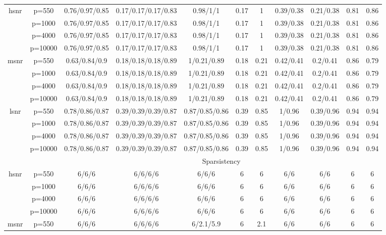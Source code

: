 \begin{table}[ht]
{\begin{tabular}{|c|c|ccccccccc|}
\midrule\multirow{4}[2]{*}{hsnr} & p=550 & 0.76/0.97/0.85 & 0.17/0.17/0.17/0.83 & 0.98/1/1 & 0.17 & 1 & 0.39/0.38 & 0.21/0.38 & 0.81 & 0.86 \\ 
   & p=1000 & 0.76/0.97/0.85 & 0.17/0.17/0.17/0.83 & 0.98/1/1 & 0.17 & 1 & 0.39/0.38 & 0.21/0.38 & 0.81 & 0.86 \\ 
   & p=4000 & 0.76/0.97/0.85 & 0.17/0.17/0.17/0.83 & 0.98/1/1 & 0.17 & 1 & 0.39/0.38 & 0.21/0.38 & 0.81 & 0.86 \\ 
   & p=10000 & 0.76/0.97/0.85 & 0.17/0.17/0.17/0.83 & 0.98/1/1 & 0.17 & 1 & 0.39/0.38 & 0.21/0.38 & 0.81 & 0.86 \\ 
  \midrule\multirow{4}[2]{*}{msnr} & p=550 & 0.63/0.84/0.9 & 0.18/0.18/0.18/0.89 & 1/0.21/0.89 & 0.18 & 0.21 & 0.42/0.41 & 0.2/0.41 & 0.86 & 0.79 \\ 
   & p=1000 & 0.63/0.84/0.9 & 0.18/0.18/0.18/0.89 & 1/0.21/0.89 & 0.18 & 0.21 & 0.42/0.41 & 0.2/0.41 & 0.86 & 0.79 \\ 
   & p=4000 & 0.63/0.84/0.9 & 0.18/0.18/0.18/0.89 & 1/0.21/0.89 & 0.18 & 0.21 & 0.42/0.41 & 0.2/0.41 & 0.86 & 0.79 \\ 
   & p=10000 & 0.63/0.84/0.9 & 0.18/0.18/0.18/0.89 & 1/0.21/0.89 & 0.18 & 0.21 & 0.42/0.41 & 0.2/0.41 & 0.86 & 0.79 \\ 
  \midrule\multirow{4}[2]{*}{lsnr} & p=550 & 0.78/0.86/0.87 & 0.39/0.39/0.39/0.87 & 0.87/0.85/0.86 & 0.39 & 0.85 & 1/0.96 & 0.39/0.96 & 0.94 & 0.94 \\ 
   & p=1000 & 0.78/0.86/0.87 & 0.39/0.39/0.39/0.87 & 0.87/0.85/0.86 & 0.39 & 0.85 & 1/0.96 & 0.39/0.96 & 0.94 & 0.94 \\ 
   & p=4000 & 0.78/0.86/0.87 & 0.39/0.39/0.39/0.87 & 0.87/0.85/0.86 & 0.39 & 0.85 & 1/0.96 & 0.39/0.96 & 0.94 & 0.94 \\ 
   & p=10000 & 0.78/0.86/0.87 & 0.39/0.39/0.39/0.87 & 0.87/0.85/0.86 & 0.39 & 0.85 & 1/0.96 & 0.39/0.96 & 0.94 & 0.94 \\ 
   \midrule 
 \multicolumn{1}{|c}{} &       & \multicolumn{9}{c|}{Sparsistency} \\
\midrule\multirow{4}[2]{*}{hsnr} & p=550 & 6/6/6 & 6/6/6/6 & 6/6/6 & 6 & 6 & 6/6 & 6/6 & 6 & 6 \\ 
   & p=1000 & 6/6/6 & 6/6/6/6 & 6/6/6 & 6 & 6 & 6/6 & 6/6 & 6 & 6 \\ 
   & p=4000 & 6/6/6 & 6/6/6/6 & 6/6/6 & 6 & 6 & 6/6 & 6/6 & 6 & 6 \\ 
   & p=10000 & 6/6/6 & 6/6/6/6 & 6/6/6 & 6 & 6 & 6/6 & 6/6 & 6 & 6 \\ 
  \midrule\multirow{4}[2]{*}{msnr} & p=550 & 6/6/6 & 6/6/6/6 & 6/2.1/5.9 & 6 & 2.1 & 6/6 & 6/6 & 6 & 6 \\ 

\end{tabular}}
\end{table}
